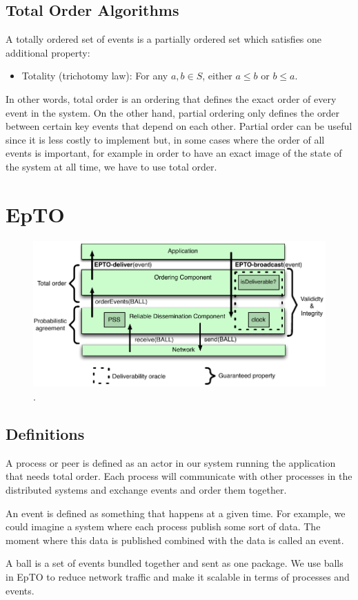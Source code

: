 \documentclass[10pt,conference,a4paper]{IEEEtran}
\begin{document}
\subsection{Total Order Algorithms}
A totally ordered set of events is a partially ordered set which satisfies one additional property:
\begin{itemize}
	\item Totality (trichotomy law): For any $a, b \in S$, either $a \leq b$  or $b \leq a$.
\end{itemize}
\par
In other words, total order is an ordering that defines the exact order of every event in the system. On the other hand, partial ordering only defines the order between certain key events that depend on each other. Partial order can be useful since it is less costly to implement but, in some cases where the order of all events is important, for example in order to have an exact image of the state of the system at all time, we have to use total order.

\section{EpTO}
\begin{figure}
	\includegraphics[width=\linewidth]{figures/epto-architecture.png}
	\caption{\protect\footnotemark{}.}
	\label{fig:epto-architecture}
\end{figure}
\subsection{Definitions}
A process or peer is defined as an actor in our system running the application that needs total order. Each process will communicate with other processes in the distributed systems and exchange events and order them together.
\par
An event is defined as something that happens at a given time. For example, we could imagine a system where each process publish some sort of data. The moment where this data is published combined with the data is called an event.
\par
A ball is a set of events bundled together and sent as one package. We use balls in EpTO to reduce network traffic and make it scalable in terms of processes and events.
\end{document}
